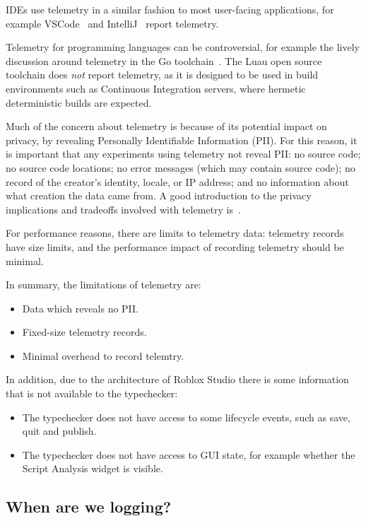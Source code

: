 \documentclass[english,submission,cleveref]{programming}
\begin{document}
IDEs use telemetry in a similar fashion to most user-facing
applications, for example VSCode~\cite{vsc-telemetry} and
IntelliJ~\cite{intellij-telemetry} report telemetry.

Telemetry for programming languages can be controversial, for example
the lively discussion around telemetry in the Go
toolchain~\cite{golang-telemetry}. 
The Luau open source toolchain does \emph{not} report telemetry,
as it is designed to be used in build environments such as Continuous Integration
servers, where hermetic deterministic builds are expected.

Much of the concern about telemetry is because of its potential impact on
privacy, by revealing Personally Identifiable Information (PII).
For this reason, it is important that any experiments using telemetry
not reveal PII:
no source code;
no source code locations;
no error messages (which may contain source code);
no record of the creator's identity, locale, or IP address;
and no information about what creation the data came from.
A good introduction to the privacy implications and tradeoffs
involved with telemetry is~\cite{transparent-telemetry}.

For performance reasons, there are limits to telemetry data:
telemetry records have size limits, and the performance impact of
recording telemetry should be minimal.

In summary, the limitations of telemetry are:
\begin{itemize}
  \item Data which reveals no PII.
  \item Fixed-size telemetry records.
  \item Minimal overhead to record telemtry.
\end{itemize}
In addition, due to the architecture of Roblox Studio
there is some information that is not available to the
typechecker:
\begin{itemize}
  \item The typechecker does not have access to some lifecycle events,
    such as save, quit and publish.
  \item The typechecker does not have access to GUI state, for example
    whether the Script Analysis widget is visible.
\end{itemize}

\subsection{When are we logging?}
\end{document}
